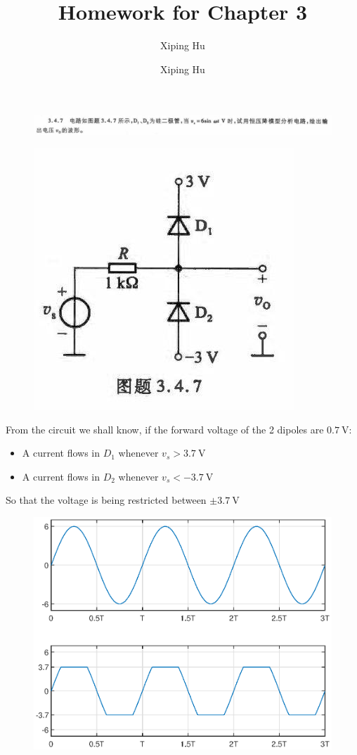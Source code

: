 \documentclass{article}
\author{Xiping Hu}
\author{Xiping Hu}
\affil{http://thehxp.tech/}
\title{Homework for Chapter 3}
\begin{document}
\maketitle

\begin{figure}[H]
  \centering
  \includegraphics[width=\linewidth]{figures/Problem1-1}
  \label{fig:}
\end{figure}
\begin{figure}[H]
  \centering
  \includegraphics[width=0.7\linewidth]{figures/Problem1-2}
  \label{fig:}
\end{figure}

From the circuit we shall know, if the forward voltage of the 2 dipoles are $0.7 \  \mathrm{V}$:
\begin{itemize}
\item A current flows in $D_1$ whenever $v_s > 3.7 \  \mathrm{V}$
\item A current flows in $D_2$ whenever $v_s < - 3.7 \  \mathrm{V}$
\end{itemize}

So that the voltage is being restricted between $\pm 3.7 \  \mathrm{V}$ 


\begin{figure}[H]
  \centering
  \includegraphics[width=\linewidth]{figures/Problem1-3}
  \label{fig:}
\end{figure}
\end{document}
